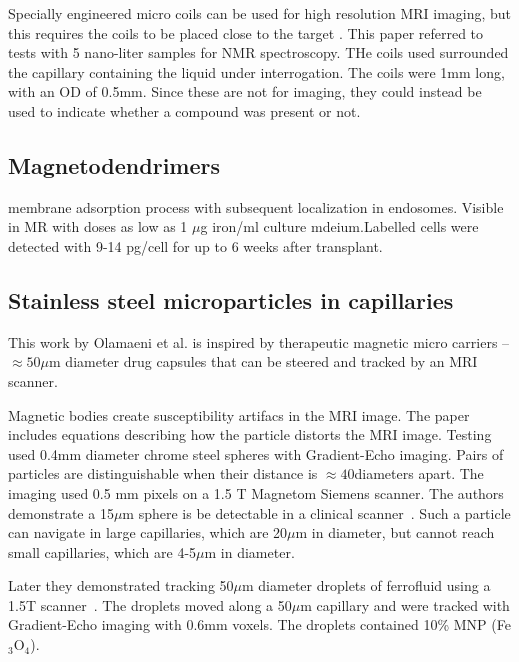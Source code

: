 \documentclass[letterpaper, 10 pt, conference]{ieeeconf}
\begin{document}
 
 Specially engineered micro coils can be used for high resolution MRI imaging, but this requires the coils to be placed close to the target \cite{olson1995high}.  This paper referred to tests with 5 nano-liter samples for NMR spectroscopy.  THe coils used surrounded the capillary containing the liquid under interrogation. The coils were 1mm long, with an OD of 0.5mm. Since these are not for imaging, they could instead be used to indicate whether a compound was present or not.
 
 \subsection{Magnetodendrimers}
 \cite{bulte2001magnetodendrimers}
 
 membrane adsorption process with subsequent localization in endosomes. Visible in MR with doses as low as 1 $\mu$g iron/ml culture mdeium.Labelled cells were detected with 9-14 pg/cell for up to 6 weeks after transplant. 
 

 
 
\subsection{Stainless steel microparticles in capillaries}
This work by Olamaeni et al. \cite{olamaei2011accurate} is inspired by therapeutic magnetic micro carriers -- $\approx 50\mu$m diameter drug capsules that can be steered and tracked by an MRI scanner. 

Magnetic bodies create susceptibility artifacs in the MRI image. The paper\cite{olamaei2011accurate}  includes equations describing how the particle distorts the MRI image.  Testing used 0.4mm diameter chrome steel spheres with Gradient-Echo imaging. Pairs of particles are distinguishable when their distance is $\approx40$diameters apart. The imaging used 0.5 mm pixels on a 1.5 T Magnetom Siemens scanner.  The authors demonstrate a 15$\mu$m sphere is be detectable in a clinical scanner~\cite{olamaei2010mri}. Such a particle can navigate in large capillaries, which are 20$\mu$m in diameter, but cannot reach small capillaries, which are 4-5$\mu$m in diameter.
 
 Later they demonstrated tracking 50$\mu$m diameter droplets of ferrofluid using a 1.5T scanner~\cite{olamaei2013magnetic}.  The droplets moved along a 50$\mu$m capillary and were tracked with Gradient-Echo imaging with 0.6mm voxels.  The droplets contained 10\% MNP (Fe$_\textrm{3}$O$_{\textrm{4}}$).
 
\end{document}
